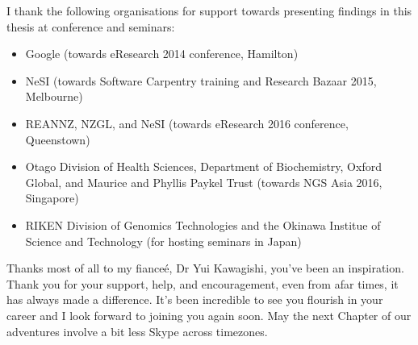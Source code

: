 I thank the following organisations for support towards presenting findings in this thesis at conference and seminars:

\begin{itemize}

\item
Google (towards eResearch 2014 conference, Hamilton)

\item
NeSI (towards Software Carpentry training and Research Bazaar 2015, Melbourne)

\item
REANNZ, NZGL, and NeSI (towards eResearch 2016 conference, Queenstown)

\item
Otago Division of Health Sciences, Department of Biochemistry, Oxford Global, and Maurice and Phyllis Paykel Trust (towards NGS Asia 2016, Singapore)

\item
RIKEN Division of Genomics Technologies and the Okinawa Institue of Science and Technology (for hosting seminars in Japan)

\end{itemize}

Thanks most of all to my fiance\'{e}, Dr Yui Kawagishi, you've been an inspiration. Thank you for your support, help, and encouragement, even from afar times, it has always made a difference. It's been incredible to see you flourish in your career and I look forward to joining you again soon. May the next Chapter of our adventures involve a bit less Skype across timezones.
